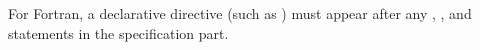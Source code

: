 For Fortran, a declarative directive (such as )
must appear after any , , and  statements
in the specification part.








